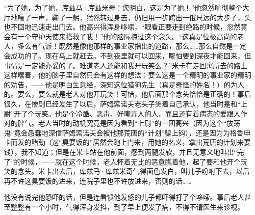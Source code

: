 \par “为了她，为了她，库兹马·库兹米奇！您明白，这是为了她！”他忽然响彻整个大厅地嚷了一声，鞠了一躬，猛然转过身去，仍旧用一步跨出一俄尺远的大步子，头也不回地迅速走出门去。他高兴得浑身哆嗦，“眼看正要走到绝路的时候，忽然竟会有一个守护天使来搭救了我！”他的脑际掠过这个念头。“这真是位极高尚的老人，多么有气派！既然是像他那样的事业家指出的道路，那么……那么自然是一定会成功的了。现在马上就赶去。不到夜里就可以回来，哪怕要到深夜才能回来，但事情是一定能办妥的了。难道老人还能和我开玩笑么？”米卡在走回寓所去的路上这样嚷着，他的脑子里自然只会有这样的想法：要么这是一个精明的事业家的精明的劝告，——他是明白生意经，深知这位猎狗先生（真是奇怪的姓名！）的为人的。要么，要么就是老人对他开玩笑！可惜，他后面那个念头恰恰是正确的！事后很久，在惨剧已经发生了以后，萨姆索诺夫老头子笑着自己承认，他当时是和“上尉”开了个玩笑。他是个冷酷、恶毒、好嘲弄人的人，而且还有着病态的爱跟人作对的脾气。老人当时的动机究竟是因为看到“上尉”的一团高兴（因为这个“放荡鬼”竟会愚蠢地深信萨姆索诺夫会被他那荒唐的“计划”骗上钩），还是因为为格鲁申卡而发的醋劲（这“臭要饭的”居然会跑上门来，用她的名义，拿出荒唐的计划来要钱），我不知道；但是在米卡站在他前面，感到两腿发软，并且无意义地叫出“完了”的时候，——就在这个时候，老人怀着无比的恶意瞧着他，起了要和他开个玩笑的念头。米卡出去后，库兹马·库兹米奇气得面色发白，叫儿子吩咐下去，以后再不许这臭要饭的进来，连院子里也不许放进来，否则的话……
\par 他没有说完他恐吓的话，但是连看惯他发怒的儿子都吓得打了个哆嗦。事后老人甚至整整有一个小时，气得浑身发抖，到了早上便发了病，不得不请医生来诊视。
